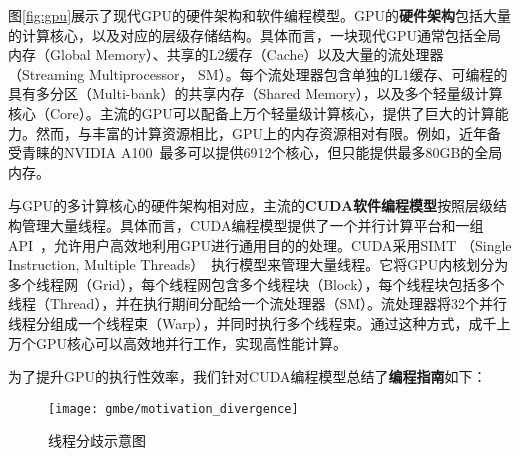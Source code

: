 图\ref{fig:gpu}展示了现代GPU的硬件架构和软件编程模型。GPU的\textbf{硬件架构}包括大量的计算核心，以及对应的层级存储结构。具体而言，一块现代GPU通常包括全局内存（Global Memory）、共享的L2缓存（Cache）以及大量的流处理器 （Streaming Multiprocessor， SM）。每个流处理器包含单独的L1缓存、可编程的具有多分区（Multi-bank）的共享内存（Shared Memory），以及多个轻量级计算核心（Core）。主流的GPU可以配备上万个轻量级计算核心，提供了巨大的计算能力。然而，与丰富的计算资源相比，GPU上的内存资源相对有限。例如，近年备受青睐的NVIDIA A100~\cite{NVIDIA-A100}最多可以提供6912个核心，但只能提供最多80GB的全局内存。

与GPU的多计算核心的硬件架构相对应，主流的\textbf{CUDA软件编程模型}按照层级结构管理大量线程。具体而言，CUDA编程模型提供了一个并行计算平台和一组API~\cite{CUDA-wiki,CUDAProgrammingGuide}，允许用户高效地利用GPU进行通用目的的处理。CUDA采用SIMT （Single Instruction, Multiple Threads）~\cite{SIMT-wiki}执行模型来管理大量线程。它将GPU内核划分为多个线程网（Grid），每个线程网包含多个线程块（Block），每个线程块包括多个线程（Thread），并在执行期间分配给一个流处理器（SM）。流处理器将32个并行线程分组成一个线程束（Warp），并同时执行多个线程束。通过这种方式，成千上万个GPU核心可以高效地并行工作，实现高性能计算。




为了提升GPU的执行性效率，我们针对CUDA编程模型总结了\textbf{编程指南}如下：

\begin{figure} [t]
  \center
		\texttt{[image: gmbe/motivation\_divergence]}
	\caption{线程分歧示意图}
	\label{fig:gmbe_motivation_divergence}
\end{figure}



